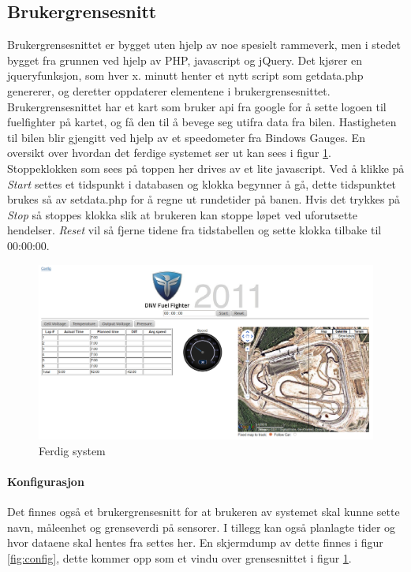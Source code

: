 \subsection{Brukergrensesnitt}
Brukergrensesnittet er bygget uten hjelp av noe spesielt rammeverk, men i stedet bygget fra grunnen ved hjelp av PHP, javascript og jQuery\cite{jquery}. Det kjører en jqueryfunksjon, som hver x. minutt henter et nytt script som getdata.php genererer, og deretter oppdaterer elementene i brukergrensesnittet. Brukergrensesnittet har et kart som bruker api fra google for å sette logoen til fuelfighter på kartet, og få den til å bevege seg utifra data fra bilen. Hastigheten til bilen blir gjengitt ved hjelp av et speedometer fra Bindows Gauges\cite{bindows}. En oversikt over hvordan det ferdige systemet ser ut kan sees i figur \ref{fig:gui}. Stoppeklokken som sees på toppen her drives av et lite javascript. Ved å klikke på {\em Start} settes et tidspunkt i databasen og klokka begynner å gå, dette tidspunktet brukes så av setdata.php for å regne ut rundetider på banen. Hvis det trykkes på {\em Stop} så stoppes klokka slik at brukeren kan stoppe løpet ved uforutsette hendelser. {\em Reset} vil så fjerne tidene fra tidstabellen og sette klokka tilbake til 00:00:00.

\begin{figure}[H]
\includegraphics[width=\textwidth]{images/gui.png}
\caption{Ferdig system} 
\label{fig:gui}
\end{figure}

\paragraph{Konfigurasjon}
Det finnes også et brukergrensesnitt for at brukeren av systemet skal kunne sette navn, måleenhet og grenseverdi på sensorer. I tillegg kan også planlagte tider og hvor dataene skal hentes fra settes her.
En skjermdump av dette finnes i figur \ref{fig:config}, dette kommer opp som et vindu over grensesnittet i figur \ref{fig:gui}.

